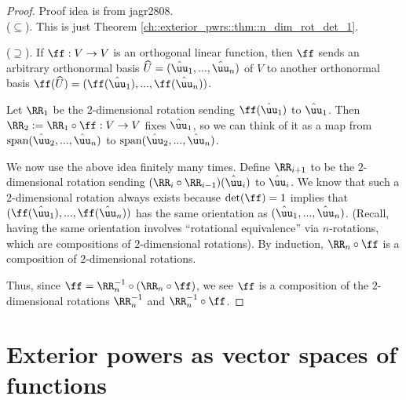 \begin{proof}
    \scriptsize Proof idea is from jagr2808. 
    \fontsize{10pt}{12pt}\selectfont \\
    \indent ($\subseteq$). This is just Theorem \ref{ch::exterior_pwrs::thm::n_dim_rot_det_1}.
    
    \indent ($\supseteq$). If $\ff:V \rightarrow V$ is an orthogonal linear function, then $\ff$ sends an arbitrary orthonormal basis $\hU = (\huu_1, ..., \huu_n)$ of $V$ to another orthonormal basis $\ff(\hU) = (\ff(\huu_1), ..., \ff(\huu_n))$.

    Let $\RR_1$ be the $2$-dimensional rotation sending $\ff(\huu_1)$ to $\huu_1$. Then $\RR_2 := \RR_1 \circ \ff:V \rightarrow V$ fixes $\huu_1$, so we can think of it as a map from $\spann(\huu_2, ..., \huu_n)$ to $\spann(\huu_2, ..., \huu_n)$. 
    
    We now use the above idea finitely many times. Define $\RR_{i + 1}$ to be the $2$-dimensional rotation sending ${(\RR_i \circ \RR_{i - 1})(\huu_i)}$ to $\huu_i$. We know that such a $2$-dimensional rotation always exists because $\det(\ff) = 1$ implies that $(\ff(\huu_1), ..., \ff(\huu_n))$ has the same orientation as $(\huu_1, ..., \huu_n)$. (Recall, having the same orientation involves ``rotational equivalence'' via $n$-rotations, which are compositions of $2$-dimensional rotations). By induction, $\RR_n \circ \ff$ is a composition of $2$-dimensional rotations.
    
    Thus, since $\ff = \RR_n^{-1} \circ (\RR_n \circ \ff)$, we see $\ff$ is a composition of the $2$-dimensional rotations $\RR_n^{-1}$ and $\RR_n^{-1} \circ \ff$.
    

\end{proof}

\newpage

\section{Exterior powers as vector spaces of functions}

    
